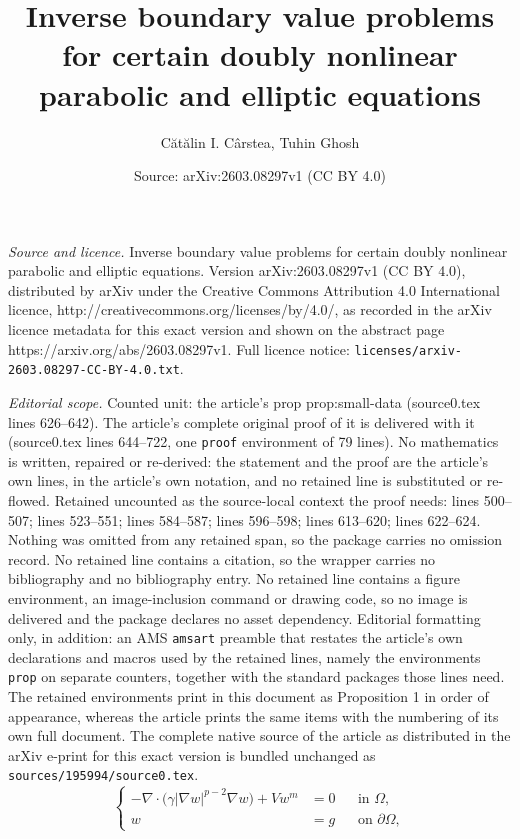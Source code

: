 \documentclass[10pt,a4paper]{amsart}
\title{Inverse boundary value problems for certain doubly nonlinear parabolic and elliptic equations}
\author{C\u{a}t\u{a}lin I. C\^arstea, Tuhin Ghosh}
\date{Source: arXiv:2603.08297v1 (CC BY 4.0)}
\newcommand{\pr}{\partial}
\begin{document}
\maketitle

\noindent\emph{Source and licence.} Inverse boundary value problems for certain doubly nonlinear parabolic and elliptic equations. Version arXiv:2603.08297v1 (CC BY 4.0), distributed by arXiv under the Creative Commons Attribution 4.0 International licence, http://creativecommons.org/licenses/by/4.0/, as recorded in the arXiv licence metadata for this exact version and shown on the abstract page https://arxiv.org/abs/2603.08297v1. Full licence notice: \texttt{licenses/arxiv-2603.08297-CC-BY-4.0.txt}.\par\smallskip

\noindent\textit{Editorial scope.} Counted unit: the article's prop prop:small-data (source0.tex lines 626--642). The article's complete original proof of it is delivered with it (source0.tex lines 644--722, one \texttt{proof} environment of 79 lines). No mathematics is written, repaired or re-derived: the statement and the proof are the article's own lines, in the article's own notation, and no retained line is substituted or re-flowed.  Retained uncounted as the source-local context the proof needs: lines 500--507; lines 523--551; lines 584--587; lines 596--598; lines 613--620; lines 622--624.  Nothing was omitted from any retained span, so the package carries no omission record.  No retained line contains a citation, so the wrapper carries no bibliography and no bibliography entry.  No retained line contains a figure environment, an image-inclusion command or drawing code, so no image is delivered and the package declares no asset dependency.  Editorial formatting only, in addition: an AMS \texttt{amsart} preamble that restates the article's own declarations and macros used by the retained lines, namely the environments \texttt{prop} on separate counters, together with the standard packages those lines need.  The retained environments print in this document as Proposition 1 in order of appearance, whereas the article prints the same items with the numbering of its own full document.  The complete native source of the article as distributed in the arXiv e-print for this exact version is bundled unchanged as \texttt{sources/195994/source0.tex}.
\begin{equation}\label{eq:elliptic}
\left\{
\begin{aligned}
-\nabla\cdot\bigl(\gamma|\nabla w|^{p-2}\nabla w\bigr)+Vw^m&=0 &&\text{in }\Omega,\\
w&=g &&\text{on }\pr\Omega,
\end{aligned}
\right.
\end{equation}
\end{document}
